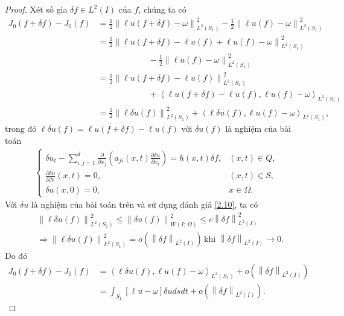 \documentclass[]{article}
\begin{document}
\begin{proof}
	Xét số gia $\delta f \in L^2(I)$ của $f$, chúng ta có
	\begin{align*}
		J_0(f+\delta f)-J_0(f)&=\frac{1}{2}\left\|\ell u(f+\delta f)-\omega\right\|^2_{L^2(S_1)}-\frac{1}{2}\left\|\ell u(f)-\omega\right\|^2_{L^2(S_1)}\\
		&=\frac{1}{2}\left\|\ell u(f+\delta f)-\ell u(f)+\ell u(f)-\omega\right\|^2_{L^2(S_1)}\\&\qquad\qquad\qquad-\frac{1}{2}\left\|\ell u(f)-\omega\right\|^2_{L^2(S_1)}\\
		&=\frac{1}{2}\left\|\ell u(f+\delta f)-\ell u(f)\right\|^2_{L^2(S_1)}\\&\qquad\qquad\qquad+\left\langle \ell u(f+\delta f)-\ell u(f), \ell u(f)-\omega\right\rangle_{L^2(S_1)}\\
		&=\frac{1}{2}\left\|\ell \delta u(f)\right\|^2_{L^2(S_1)}+\left\langle \ell\delta u(f), \ell u(f)-\omega\right\rangle_{L^2(S_1)},
	\end{align*}
	trong đó $\ell\delta u(f)=\ell u(f+\delta f)-\ell u(f)$ với $\delta u(f)$ là nghiệm của bài toán
	\begin{align}\label{3.6}
		\begin{cases}
			\delta u_t-\sum\limits_{i, j=1}^{d}\frac{\partial}{\partial x_j}\left(a_{ji}(x, t)\frac{\partial \delta u}{\partial x_i}\right)=h(x, t)\delta f,&(x, t)\in Q,\\
			\frac{\partial \delta u}{\partial \mathcal{N}}(x, t)=0, & (x, t)\in S,\\
			\delta u(x, 0)=0, &x\in \Omega.
		\end{cases}
	\end{align}
	Với $\delta u$ là nghiệm của bài toán trên và sử dụng đánh giá \eqref{2.10}, ta có
	\begin{align*}
		&\left\|\ell\delta u(f)\right\|_{L^2(S_1)}^2\leq \left\|\delta u(f)\right\|_{W(I; \, \Omega)}^2\leq c\left\|\delta f\right\|_{L^2(I)}^2\\
		&\Rightarrow\left\|\ell\delta u(f)\right\|_{L^2(S_1)}^2=o\left(\left\|\delta f\right\|_{L^2(I)}\right)\, \text{khi } \left\|\delta f\right\|_{L^2(I)}\to 0.
	\end{align*}
	Do đó
	\begin{align*}
		J_0(f+\delta f)-J_0(f)&=\left\langle \ell\delta u(f), \ell u(f)-\omega\right\rangle_{L^2(S_1)}+o\left(\left\|\delta f\right\|_{L^2(I)}\right)\\
		&=\int_{S_1}\left[\ell u-\omega\right]\delta udsdt+o\left(\left\|\delta f\right\|_{L^2(I)}\right).

\end{align*}
\end{proof}
\end{document}
